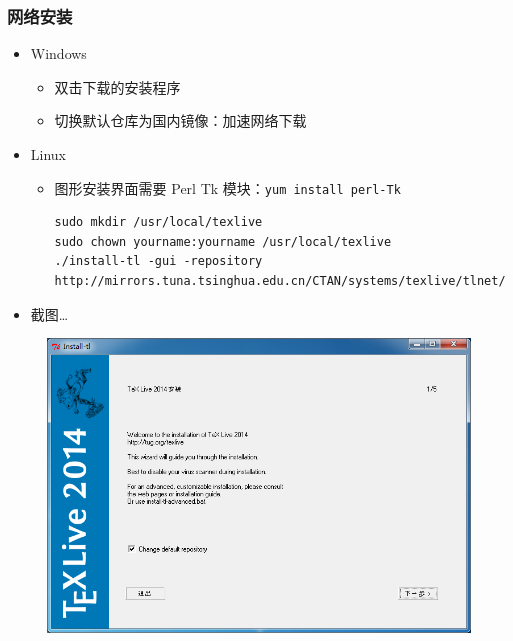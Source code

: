 \documentclass[xcolor=table,dvipsnames,svgnames]{beamer}
\begin{document}
\begin{frame}[fragile]
  \frametitle{网络安装}
  \begin{itemize}
    \item Windows
      \begin{itemize}
        \item 双击下载的安装程序
        \item 切换默认仓库为国内镜像：加速网络下载
      \end{itemize}
    \item Linux
      \begin{itemize}
        \item 图形安装界面需要 Perl Tk 模块：\texttt{yum install
          perl-Tk}
      \begin{lstlisting}
sudo mkdir /usr/local/texlive
sudo chown yourname:yourname /usr/local/texlive
./install-tl -gui -repository http://mirrors.tuna.tsinghua.edu.cn/CTAN/systems/texlive/tlnet/
      \end{lstlisting}
      \end{itemize}
\item 截图\dots
\end{itemize}
\end{frame}

\begin{frame}
  \begin{figure}[h]
  \centering
\includegraphics[scale=0.5]{simple1.png}
  \end{figure}
\end{frame}
\end{document}
